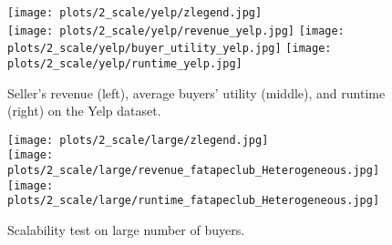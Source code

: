 \documentclass[conference]{IEEEtran}
\theoremstyle{plain}
\begin{document}
\begin{figure*}[t!]
    \centering
    \begin{minipage}[t]{.48\textwidth}
    \centering
    \texttt{[image: plots/2\_scale/yelp/zlegend.jpg]}\\
    \texttt{[image: plots/2\_scale/yelp/revenue\_yelp.jpg]}
    \texttt{[image: plots/2\_scale/yelp/buyer\_utility\_yelp.jpg]}
    \texttt{[image: plots/2\_scale/yelp/runtime\_yelp.jpg]}
    \caption{Seller's revenue (left), average buyers' utility (middle), and runtime (right) on the Yelp dataset.}
    \label{fig:yelp-results}
\end{minipage}
    \hfill
    \begin{minipage}[t]{.48\textwidth}
    \centering
    \texttt{[image: plots/2\_scale/large/zlegend.jpg]}\\
    \hfill
    \texttt{[image: plots/2\_scale/large/revenue\_fatapeclub\_Heterogeneous.jpg]}
    \quad
    \texttt{[image: plots/2\_scale/large/runtime\_fatapeclub\_Heterogeneous.jpg]}
    \hfill
    \vspace{-2mm}
    \caption{Scalability test on large number of buyers.}
    \label{fig:scale}
\end{minipage}
    \vspace{-2mm}
\end{figure*}
\end{document}
